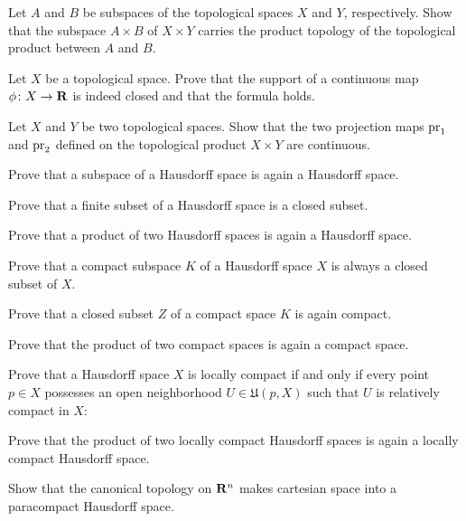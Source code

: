 \begin{xca}
  Let $A$ and $B$ be subspaces of the topological spaces $X$ and $Y$, respectively.
  Show that the subspace $A \times B$ of $X \times Y$ carries the
  product topology of the topological product between $A$ and $B$.
\end{xca}

\begin{xca}
  Let $X$ be a topological space. Prove that the support of a continuous map
  $\phi\colon X \to \mathbf{R}$ is indeed closed and that the formula 
  holds.
\end{xca}

\begin{xca}
  Let $X$ and $Y$ be two topological spaces. Show that the two projection maps
  $\mathrm{pr}_1$ and $\mathrm{pr}_2$ defined on the topological product $X \times Y$ are
  continuous.
\end{xca}

\begin{xca}
  Prove that a subspace of a Hausdorff space is again a Hausdorff space.
\end{xca}

\begin{xca}
  Prove that a finite subset of a Hausdorff space is a closed subset.
\end{xca}

\begin{xca}
  Prove that a product of two Hausdorff spaces is again a Hausdorff space.
\end{xca}

\begin{xca}
  Prove that a compact subspace $K$ of a Hausdorff space $X$ is always a closed subset
  of $X$.
\end{xca}

\begin{xca}
  Prove that a closed subset $Z$ of a compact space $K$ is again compact.
\end{xca}

\begin{xca}
  Prove that the product of two compact spaces is again a compact space.
\end{xca}

\begin{xca}
  Prove that a Hausdorff space $X$ is locally compact if and only if every point
  $p \in X$ possesses an open neighborhood $U \in \mathfrak U(p, X)$ such that
  $U$ is relatively compact in $X$:
\end{xca}

\begin{xca}
  Prove that the product of two locally compact Hausdorff spaces is again a
  locally compact Hausdorff space.
\end{xca}

\begin{xca}
  Show that the canonical topology on $\mathbf{R}^n$ makes cartesian space into
  a paracompact Hausdorff space.
\end{xca}

